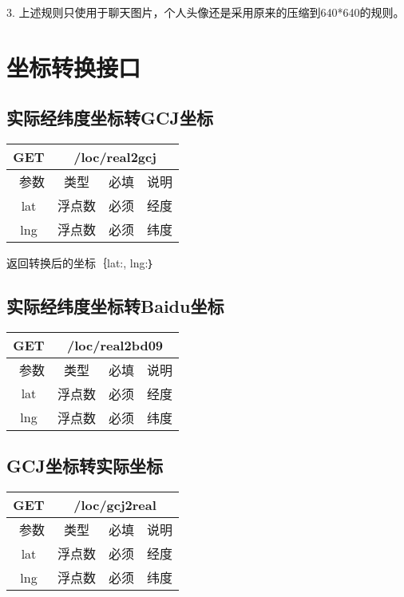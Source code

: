 \documentclass[cs4size]{ctexartutf8}
\begin{document}
3. 上述规则只使用于聊天图片，个人头像还是采用原来的压缩到640*640的规则。


\section{坐标转换接口}

\subsection{实际经纬度坐标转GCJ坐标}

\begin{table}[H]
   \begin{center}
\begin{tabular}{|c|c|c|p{12cm}|}
\hline
GET & \multicolumn{3}{|c|}{/loc/real2gcj} \\
\hline\hline
 \  参数  & 类型 & 必填 &  说明  \\
\hline
 lat  & 浮点数 & 必须 & 经度\\
\hline
 lng  &  浮点数 & 必须 & 纬度\\ 
\hline
\end{tabular}
   \end{center}
\end{table}

返回转换后的坐标｛lat:, lng:｝

\subsection{实际经纬度坐标转Baidu坐标}

\begin{table}[H]
   \begin{center}
\begin{tabular}{|c|c|c|p{12cm}|}
\hline
GET & \multicolumn{3}{|c|}{/loc/real2bd09} \\
\hline\hline
 \  参数  & 类型 & 必填 &  说明  \\
\hline
 lat  & 浮点数 & 必须 & 经度\\
\hline
 lng  &  浮点数 & 必须 & 纬度\\ 
\hline
\end{tabular}
   \end{center}
\end{table}


\subsection{GCJ坐标转实际坐标}

\begin{table}[H]
   \begin{center}
\begin{tabular}{|c|c|c|p{12cm}|}
\hline
GET & \multicolumn{3}{|c|}{/loc/gcj2real} \\
\hline\hline
 \  参数  & 类型 & 必填 &  说明  \\
\hline
 lat  & 浮点数 & 必须 & 经度\\
\hline
 lng  &  浮点数 & 必须 & 纬度\\ 
\hline
\end{tabular}
   \end{center}
\end{table}
\end{document}
